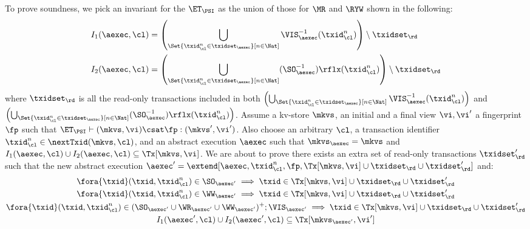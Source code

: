 To prove soundness, we pick an invariant for the \( \ET_\PSI \) as the union of those for \( \MR\) and \( \RYW \) shown in the following:
\begin{align*}
    I_1(\aexec, \cl) & =  \left( \bigcup_{\Set{\txid_{\cl}^{n} \in \txidset_{\aexec} }[ n \in \Nat ]} \VIS_{\aexec}^{-1}(\txid^n_\cl) \right) \setminus \txidset_\rd \\
    I_2(\aexec, \cl) & =  \left( \bigcup_{\Set{\txid_{\cl}^{n} \in \txidset_{\aexec} }[ n \in \Nat ]} (\SO_{\aexec}^{-1})\rflx(\txid^n_\cl) \right) \setminus \txidset_\rd
\end{align*}
where \( \txidset_\rd \) is all the read-only transactions included in both 
\( \left( \bigcup_{\Set{\txid_{\cl}^{n} \in \txidset_{\aexec} }[ n \in \Nat ]} \VIS_{\aexec}^{-1}(\txid^n_\cl) \right)\) 
and \( \left( \bigcup_{\Set{\txid_{\cl}^{n} \in \txidset_{\aexec} }[ n \in \Nat ]} (\SO_{\aexec}^{-1})\rflx(\txid^n_\cl) \right) \).
Assume a kv-store $\mkvs$, an initial and a final view $\vi, \vi'$  a fingerprint $\fp$ 
such that $\ET_{\PSI} \vdash (\mkvs, \vi) \csat \fp: (\mkvs',\vi')$. 
Also choose an arbitrary $\cl$, a transaction identifier $\txid_\cl^n \in \nextTxid(\mkvs, \cl)$, 
and an abstract execution $\aexec$ such that $\mkvs_{\aexec} = \mkvs$ and 
\( I_1(\aexec, \cl) \cup I_2(\aexec, \cl) \subseteq \Tx[\mkvs, \vi] \).
We are about to prove there exists an extra set of read-only transactions \( \txidset'_\rd \) such that
the new abstract execution \( \aexec' = \extend[\aexec, \txid_\cl^n, \fp, \Tx[\mkvs, \vi] \cup \txidset_\rd \cup \txidset'_\rd] \) and:
\begin{gather}
    \fora{\txid} (\txid, \txid_\cl^n) \in \SO_{\aexec'} \implies \txid \in \Tx[\mkvs, \vi] \cup \txidset_\rd \cup \txidset'_\rd \label{equ:psi-sound-update-so}\\
    \fora{\txid} (\txid, \txid_\cl^n) \in \WW_{\aexec'} \implies \txid \in \Tx[\mkvs, \vi] \cup \txidset_\rd \cup \txidset'_\rd \label{equ:psi-sound-update-ua}\\
    \fora{\txid} (\txid, \txid_\cl^n) \in ( \SO_{\aexec'} \cup \WR_{\aexec'} \cup \WW_{\aexec'} )^{+} ; \VIS_{\aexec'} \implies \txid \in \Tx[\mkvs, \vi] \cup \txidset_\rd \cup \txidset'_\rd \label{equ:psi-sound-update-closure}\\
    I_1(\aexec',\cl) \cup I_2(\aexec',\cl) \subseteq \Tx[\mkvs_{\aexec'}, \vi'] \label{equ:psi-sound-inv} 
\end{gather}
